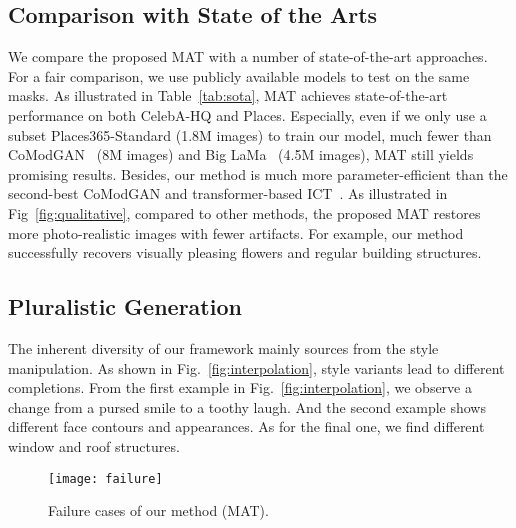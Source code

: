 \documentclass[10pt,twocolumn,letterpaper]{article}
\begin{document}
	\subsection{Comparison with State of the Arts}
	We compare the proposed MAT with a number of state-of-the-art approaches. For a fair comparison, we use publicly available models to test on the same masks. As illustrated in Table~\ref{tab:sota}, MAT achieves state-of-the-art performance on both CelebA-HQ and Places. Especially, even if we only use a subset Places365-Standard (1.8M images) to train our model, much fewer than CoModGAN~\cite{zhao2020large} (8M images) and Big LaMa~\cite{suvorov2021resolution} (4.5M images), MAT still yields promising results. Besides, our method is much more parameter-efficient than the second-best CoModGAN and transformer-based ICT~\cite{wan2021high}. As illustrated in Fig~\ref{fig:qualitative}, compared to other methods, the proposed MAT restores more photo-realistic images with fewer artifacts. For example, our method successfully recovers visually pleasing flowers and regular building structures. 

	




\subsection{Pluralistic Generation}
	\label{sec:pluralistic}
	
The inherent diversity of our framework mainly sources from the style manipulation. As shown in Fig.~\ref{fig:interpolation}, style variants lead to different completions. From the first example in Fig.~\ref{fig:interpolation}, we observe a change from a pursed smile to a toothy laugh. And the second example shows different face contours and appearances. As for the final one, we find different window and roof structures.
	






	\begin{figure}[t]
		\begin{center}
			\texttt{[image: failure]}
		\end{center}
		\vspace{-0.1in}
		\caption{Failure cases of our method (MAT). }
		\label{fig:failure}
		\vspace{-0.1in}
	\end{figure}
	
\end{document}
